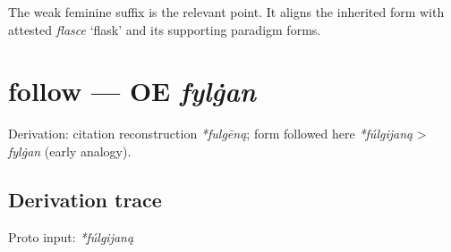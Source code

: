 \documentclass[
  british,
  a4paper,
  openany]{book}
\providecommand{\texorpdfstring}[2]{#1}
\begin{document}
The weak feminine suffix is the relevant point. It aligns the inherited
form with attested {\emph{flasce}} `flask' and its supporting paradigm
forms.

\section{\texorpdfstring{follow --- OE
\emph{fylġan}}{follow --- OE fylġan}}\label{follow-oe-fylux121an}


Derivation: citation reconstruction \emph{*fulgēną}; form followed here
\emph{*fúlgijaną} \textgreater{} \emph{fylġan} (early analogy).

\subsection{Derivation trace}\label{derivation-trace-81}

Proto input: \emph{*fúlgijaną}

\begingroup
\setlength{\fboxsep}{6pt}
\end{document}
